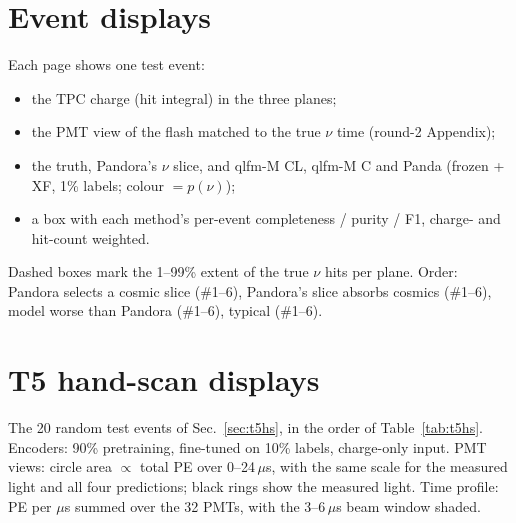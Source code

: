 \documentclass[11pt,a4paper]{article}
\begin{document}
\section{Event displays}\label{app:displays}
Each page shows one test event:
\begin{itemize}
  \item the TPC charge (hit integral) in the three planes;
  \item the PMT view of the flash matched to the true $\nu$ time (round-2 Appendix);
  \item the truth, Pandora's $\nu$ slice, and qlfm-M CL, qlfm-M C and Panda (frozen + XF, 1\% labels; colour $=p(\nu)$);
  \item a box with each method's per-event completeness / purity / F1, charge- and hit-count weighted.
\end{itemize}
Dashed boxes mark the 1--99\% extent of the true $\nu$ hits per plane. Order: Pandora selects a cosmic slice (\#1--6), Pandora's slice absorbs cosmics (\#1--6), model worse than Pandora (\#1--6), typical (\#1--6).
\clearpage


\section{T5 hand-scan displays}\label{app:t5hs}
The 20 random test events of Sec.~\ref{sec:t5hs}, in the order of Table~\ref{tab:t5hs}. Encoders: 90\% pretraining, fine-tuned on 10\% labels, charge-only input. PMT views: circle area $\propto$ total PE over 0--24\,$\mu$s, with the same scale for the measured light and all four predictions; black rings show the measured light. Time profile: PE per $\mu$s summed over the 32 PMTs, with the 3--6\,$\mu$s beam window shaded.
\clearpage

\end{document}
